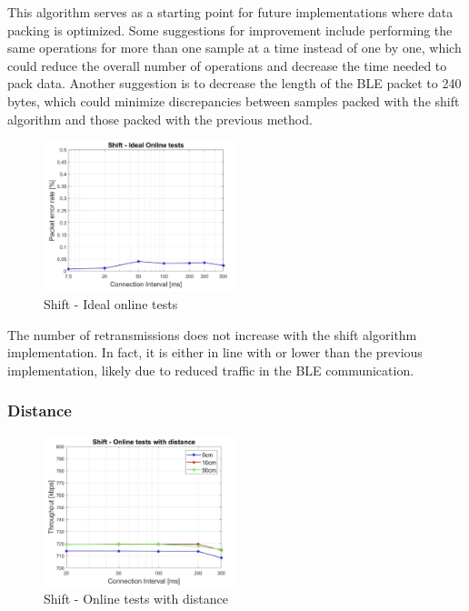 \documentclass{Configuration_Files/PoliMi3i_thesis}
\begin{document}
This algorithm serves as a starting point for future implementations where data packing is optimized. Some suggestions for improvement include performing the same operations for more than one sample at a time instead of one by one, which could reduce the overall number of operations and decrease the time needed to pack data. Another suggestion is to decrease the length of the BLE packet to 240 bytes, which could minimize discrepancies between samples packed with the shift algorithm and those packed with the previous method.

\begin{figure}[H]
    \centering
    \includegraphics[width=0.5\textwidth]{Results Manuel/figure16}
    \caption{Shift - Ideal online tests}
    \label{manuel_results_16}
\end{figure}

The number of retransmissions does not increase with the shift algorithm implementation. In fact, it is either in line with or lower than the previous implementation, likely due to reduced traffic in the BLE communication.

\subsubsection*{Distance}

\begin{figure}[H]
    \centering
    \includegraphics[width=0.5\textwidth]{Results Manuel/figure17}
    \caption{Shift - Online tests with distance}
    \label{manuel_results_17}
\end{figure}
\end{document}
